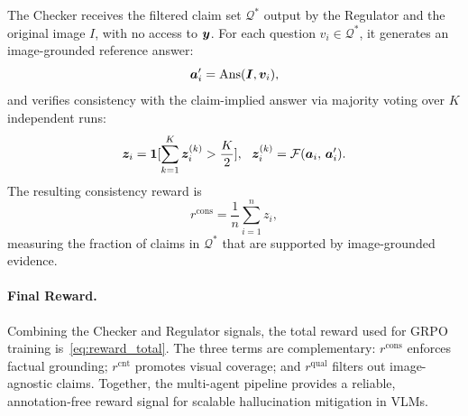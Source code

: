 The Checker receives the filtered claim set $\mathcal{Q}^{\ast}$ output by
the Regulator and the original image $I$, with no access to
${\bm{y}}$.
For each question $v_i \in \mathcal{Q}^{\ast}$, it generates an
image-grounded reference answer:
\begin{equation}
    {\bm{a}}_i' = \text{Ans}({\bm{I}}, {\bm{v}}_i),
\end{equation}
and verifies consistency with the claim-implied answer via majority voting
over $K$ independent runs:
\begin{equation}
    \vz_i = \bm{1}[
        \sum_{k=1}^{K} \vz_i^{(k)} > \frac{K}{2}],
    \ \ 
    \vz_i^{(k)} = \gF(\va_i,\, \va_i').
\end{equation}
The resulting consistency reward is
\begin{equation}
    r^{\text{cons}} = \frac{1}{n} \sum_{i=1}^{n} z_i,
\end{equation}
measuring the fraction of claims in $\mathcal{Q}^{\ast}$ that are supported
by image-grounded evidence.

\paragraph{Final Reward.}
Combining the Checker and Regulator signals, the total reward used for
GRPO training is~\eqref{eq:reward_total}.
The three terms are complementary: $r^{\text{cons}}$ enforces factual
grounding; $r^{\text{cnt}}$ promotes visual coverage; and
$r^{\text{qual}}$ filters out image-agnostic claims.
Together, the multi-agent pipeline provides a reliable, annotation-free
reward signal for scalable hallucination mitigation in VLMs.
